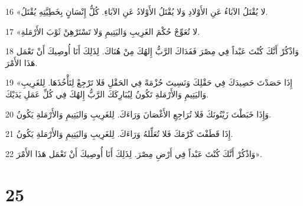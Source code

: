 \par 16 «لا يُقْتَلُ الآبَاءُ عَنِ الأَوْلادِ وَلا يُقْتَلُ الأَوْلادُ عَنِ الآبَاءِ. كُلُّ إِنْسَانٍ بِخَطِيَّتِهِ يُقْتَلُ.
\par 17 «لا تُعَوِّجْ حُكْمَ الغَرِيبِ وَاليَتِيمِ وَلا تَسْتَرْهِنْ ثَوْبَ الأَرْمَلةِ.
\par 18 وَاذْكُرْ أَنَّكَ كُنْتَ عَبْداً فِي مِصْرَ فَفَدَاكَ الرَّبُّ إِلهُكَ مِنْ هُنَاكَ. لِذَلِكَ أَنَا أُوصِيكَ أَنْ تَعْمَل هَذَا الأَمْرَ.
\par 19 «إِذَا حَصَدْتَ حَصِيدَكَ فِي حَقْلِكَ وَنَسِيتَ حُزْمَةً فِي الحَقْلِ فَلا تَرْجِعْ لِتَأْخُذَهَا. لِلغَرِيبِ وَاليَتِيمِ وَالأَرْمَلةِ تَكُونُ لِيُبَارِكَكَ الرَّبُّ إِلهُكَ فِي كُلِّ عَمَلِ يَدَيْكَ.
\par 20 وَإِذَا خَبَطْتَ زَيْتُونَكَ فَلا تُرَاجِعِ الأَغْصَانَ وَرَاءَكَ. لِلغَرِيبِ وَاليَتِيمِ وَالأَرْمَلةِ يَكُونُ.
\par 21 إِذَا قَطَفْتَ كَرْمَكَ فَلا تُعَلِّلهُ وَرَاءَكَ. لِلغَرِيبِ وَاليَتِيمِ وَالأَرْمَلةِ يَكُونُ.
\par 22 وَاذْكُرْ أَنَّكَ كُنْتَ عَبْداً فِي أَرْضِ مِصْرَ. لِذَلِكَ أَنَا أُوصِيكَ أَنْ تَعْمَل هَذَا الأَمْرَ».

\chapter{25}

